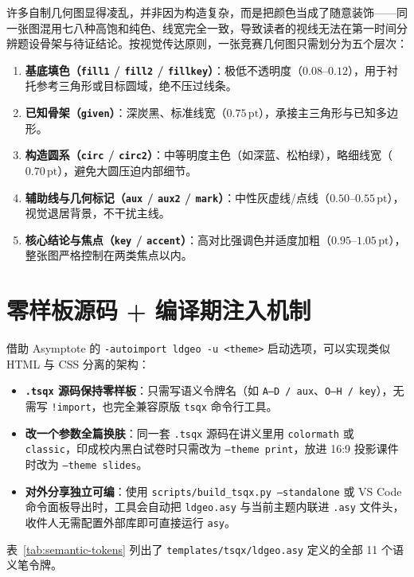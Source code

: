 \documentclass[11pt,oneside,fontset=none]{ctexbook}
\newcommand{\code}[1]{\texttt{#1}}
\begin{document}
许多自制几何图显得凌乱，并非因为构造复杂，而是把颜色当成了随意装饰——同一张图混用七八种高饱和纯色、线宽完全一致，导致读者的视线无法在第一时间分辨题设骨架与待证结论。按视觉传达原则，一张竞赛几何图只需划分为五个层次：
\begin{enumerate}
  \item \textbf{基底填色（\code{fill1} / \code{fill2} / \code{fillkey}）}：极低不透明度（\(0.08\)--\(0.12\)），用于衬托参考三角形或目标圆域，绝不压过线条。
  \item \textbf{已知骨架（\code{given}）}：深炭黑、标准线宽（\(0.75\,\mathrm{pt}\)），承接主三角形与已知多边形。
  \item \textbf{构造圆系（\code{circ} / \code{circ2}）}：中等明度主色（如深蓝、松柏绿），略细线宽（\(0.70\,\mathrm{pt}\)），避免大圆压迫内部细节。
  \item \textbf{辅助线与几何标记（\code{aux} / \code{aux2} / \code{mark}）}：中性灰虚线/点线（\(0.50\)--\(0.55\,\mathrm{pt}\)），视觉退居背景，不干扰主线。
  \item \textbf{核心结论与焦点（\code{key} / \code{accent}）}：高对比强调色并适度加粗（\(0.95\)--\(1.05\,\mathrm{pt}\)），整张图严格控制在两类焦点以内。
\end{enumerate}

\section{零样板源码 + 编译期注入机制}

借助 Asymptote 的 \code{-autoimport ldgeo -u <theme>} 启动选项，可以实现类似 HTML 与 CSS 分离的架构：
\begin{itemize}
  \item \textbf{\code{.tsqx} 源码保持零样板}：只需写语义令牌名（如 \code{A--D / aux}、\code{O--H / key}），无需写 \code{!import}，也完全兼容原版 \code{tsqx} 命令行工具。
  \item \textbf{改一个参数全篇换肤}：同一套 \code{.tsqx} 源码在讲义里用 \code{colormath} 或 \code{classic}，印成校内黑白试卷时只需改为 \code{--theme print}，放进 16:9 投影课件时改为 \code{--theme slides}。
  \item \textbf{对外分享独立可编}：使用 \code{scripts/build\_tsqx.py --standalone} 或 VS Code 命令面板导出时，工具会自动把 \code{ldgeo.asy} 与当前主题内联进 \code{.asy} 文件头，收件人无需配置外部库即可直接运行 \code{asy}。
\end{itemize}

表~\ref{tab:semantic-tokens} 列出了 \code{templates/tsqx/ldgeo.asy} 定义的全部 11 个语义笔令牌。
\end{document}
